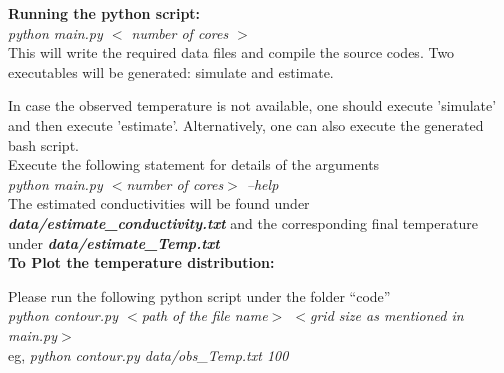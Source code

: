 \documentclass[10pt,a4paper]{report}
\begin{document}
\begin{appendices}
\noindent
\textbf{Running the python script:}\\

\textit{python main.py $<$ \textit{number of cores} $>$}\\

This will write the required data files and compile the source codes. Two executables will be generated: simulate and estimate. 

In case the observed temperature is not available, one should execute 'simulate' and then execute 'estimate'. Alternatively, one can also execute the generated bash script.\\

Execute the following statement for details of the arguments\\

\textit{python main.py $<$number of cores$>$ --help}\\

The estimated conductivities will be found under \textit{\textbf{data/estimate\_conductivity.txt}} and the corresponding final temperature under \textit{\textbf{data/estimate\_Temp.txt}}\\
\linebreak
\textbf{To Plot the temperature distribution:}

Please run the following python script  under the folder “code”\\

\textit{python contour.py $<$path of the file name$>$ $<$grid size as mentioned in main.py$>$ }\\

eg, \textit{python contour.py data/obs\_Temp.txt 100}


%
%
%

\end{appendices}


%
%
%
% 
\end{document}
